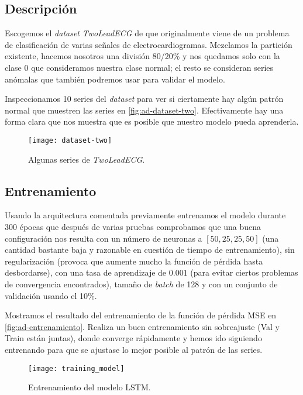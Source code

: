 \subsection{Descripción}

Escogemos el \emph{dataset} \emph{TwoLeadECG} de \cite{bagnall2020ts} que originalmente viene de un problema de clasificación de varias señales de electrocardiogramas. Mezclamos la partición existente, hacemos nosotros una división 80/20\% y nos quedamos solo con la clase 0 que consideramos nuestra clase normal; el resto se consideran series anómalas que también podremos usar para validar el modelo.

Inspeccionamos 10 series del \emph{dataset} para ver si ciertamente hay algún patrón normal que muestren las series en \autoref{fig:ad-dataset-two}. Efectivamente hay una forma clara que nos muestra que es posible que nuestro modelo pueda aprenderla.

\begin{figure}[htpb]
  \centering
  \texttt{[image: dataset-two]}
  \caption{Algunas series de \emph{TwoLeadECG}.}
  \label{fig:ad-dataset-two}
\end{figure}

\subsection{Entrenamiento}

Usando la arquitectura comentada previamente entrenamos el modelo durante 300 épocas que después de varias pruebas comprobamos que una buena configuración nos resulta con un número de neuronas a $[50, 25, 25, 50]$ (una cantidad bastante baja y razonable en cuestión de tiempo de entrenamiento), sin regularización (provoca que aumente mucho la función de pérdida hasta desbordarse), con una tasa de aprendizaje de $0.001$ (para evitar ciertos problemas de convergencia encontrados), tamaño de \emph{batch} de 128 y con un conjunto de validación usando el 10\%.

Mostramos el resultado del entrenamiento de la función de pérdida MSE en \autoref{fig:ad-entrenamiento}. Realiza un buen entrenamiento sin sobreajuste (Val y Train están juntas), donde converge rápidamente y hemos ido siguiendo entrenando para que se ajustase lo mejor posible al patrón de las series.

\begin{figure}[htpb]
  \centering
  \texttt{[image: training\_model]}
  \caption{Entrenamiento del modelo LSTM.}
  \label{fig:ad-entrenamiento}
\end{figure}

